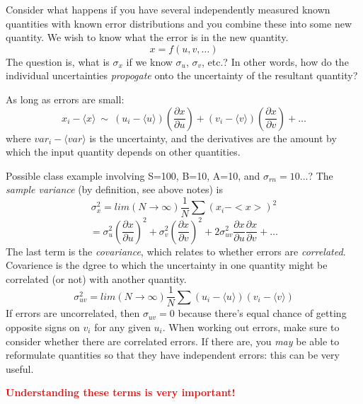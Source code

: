\documentclass[12pt]{article}
\newcommand{\mynotes}[1]{\textcolor{myBlue}{#1}}
\begin{document}
Consider what happens if you have several independently measured known
quantities with known error distributions and you combine these into some new
quantity. We wish to know what the error is in the new quantity.
\[
    x = f(u, v, \ldots) 
    \]
The question is, what is $\sigma_x$ if we know
$\sigma_u$, $\sigma_v$, etc.?
\mynotes{In other words, how do the individual uncertainties
\emph{propogate} onto the uncertainty of the resultant quantity?}

As long as errors are small:
\[
    x_{i} -  \langle x \rangle  \ \sim \
    (u_{i} -  \langle u \rangle )\left(\frac{\partial x}{\partial u}\right)
    + (v_{i} -  \langle v \rangle )\left( \frac{\partial x}{\partial v}  \right)
    + \ldots
    \]
where $var_{i} -  \langle var \rangle $ is the uncertainty, and the derivatives are the
amount by which the input quantity depends on other quantities.

\mynotes{Possible class example involving
S=100, B=10, A=10, and $\sigma_{rn}=10\ldots$?
The \emph{sample variance} (by definition, see above notes) is}
\[
    \sigma_{x}^{2} = lim(N \rightarrow \infty)\frac{1}{N} \sum(x_{i} - <x>)^{2}
    \]
\[
    = \sigma_u^{2}\left(\frac{\partial x}{\partial u}\right)^{2}
    + \sigma_v^{2}\left(\frac{\partial x}{\partial v}\right)^{2}
    + 2\sigma_{uv}^{2}\frac{\partial x}{\partial u}
    \frac{\partial x}{\partial v} + \ldots
    \]
The last term is the \textit{covariance}, which relates to whether errors are
\textit{correlated}.
\mynotes{Covarience is the dgree to which the uncertainty
in one quantity might be correlated (or not) with another quantity}.
\[
    \sigma_{uv}^{2} = lim(N \rightarrow\infty)\frac{1}{N}
    \sum(u_{i} -  \langle u \rangle )(v_{i} -  \langle v \rangle )
    \]
If errors are uncorrelated, then $\sigma_{uv} = 0$ because there's
equal chance of getting opposite signs on $v_{i}$ for any given $u_{i}$.
When working out errors, make sure to consider whether there are
correlated errors. If there are, you \emph{may} be able to reformulate
quantities so that they have independent errors: this can be very
useful.

\textcolor{red}{\textbf{Understanding these terms is very important!}}
\end{document}
